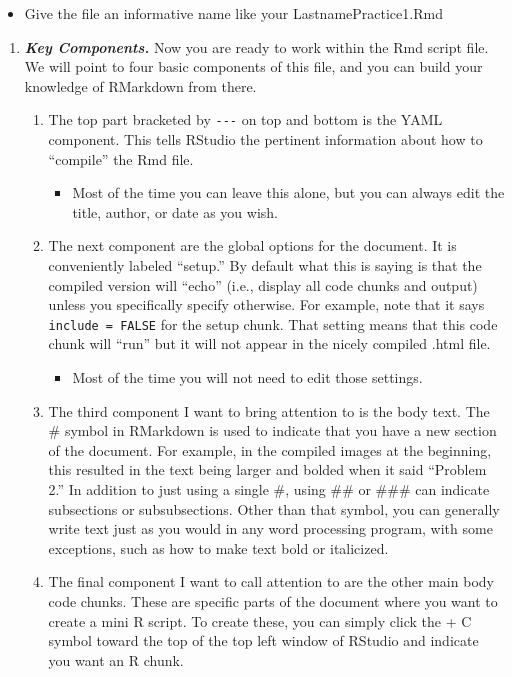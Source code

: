 \documentclass[
  letterpaper,
  DIV=11,
  numbers=noendperiod]{scrreprt}
\providecommand{\tightlist}{%
  \setlength{\itemsep}{0pt}\setlength{\parskip}{0pt}}\usepackage{longtable,booktabs,array}
\begin{document}
\begin{itemize}
\tightlist
\item
  Give the file an informative name like your LastnamePractice1.Rmd
\end{itemize}

\begin{enumerate}
\def\labelenumi{\arabic{enumi}.}
\setcounter{enumi}{4}
\item
  \textbf{\emph{Key Components.}} Now you are ready to work within the
  Rmd script file. We will point to four basic components of this file,
  and you can build your knowledge of RMarkdown from there.

  \begin{enumerate}
  \def\labelenumii{\arabic{enumii}.}
  \tightlist
  \item
    The top part bracketed by \texttt{-\/-\/-} on top and bottom is the
    YAML component. This tells RStudio the pertinent information about
    how to ``compile'' the Rmd file.

    \begin{itemize}
    \tightlist
    \item
      Most of the time you can leave this alone, but you can always edit
      the title, author, or date as you wish.
    \end{itemize}
  \item
    The next component are the global options for the document. It is
    conveniently labeled ``setup.'' By default what this is saying is
    that the compiled version will ``echo'' (i.e., display all code
    chunks and output) unless you specifically specify otherwise. For
    example, note that it says \texttt{include\ =\ FALSE} for the setup
    chunk. That setting means that this code chunk will ``run'' but it
    will not appear in the nicely compiled .html file.

    \begin{itemize}
    \tightlist
    \item
      Most of the time you will not need to edit those settings.
    \end{itemize}
  \item
    The third component I want to bring attention to is the body text.
    The \# symbol in RMarkdown is used to indicate that you have a new
    section of the document. For example, in the compiled images at the
    beginning, this resulted in the text being larger and bolded when it
    said ``Problem 2.'' In addition to just using a single \#, using
    \#\# or \#\#\# can indicate subsections or subsubsections. Other
    than that symbol, you can generally write text just as you would in
    any word processing program, with some exceptions, such as how to
    make text bold or italicized.
  \item
    The final component I want to call attention to are the other main
    body code chunks. These are specific parts of the document where you
    want to create a mini R script. To create these, you can simply
    click the + C symbol toward the top of the top left window of
    RStudio and indicate you want an R chunk.
  \end{enumerate}


\end{enumerate}
\end{document}
